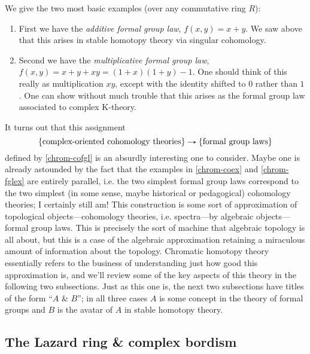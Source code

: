\begin{examples}
  \label{chrom-fglex}
  We give the two most basic examples (over any commutative ring $R$):
  \begin{enumerate}
  \item First we have the \emph{additive formal group law},
    $f(x,y) = x+y$. We saw above that this arises in stable homotopy
    theory via singular cohomology.
  \item Second we have the \emph{multiplicative formal group law},
    $f(x,y) = x+y+xy = (1+x)(1+y)-1$. One should think of this really
    as multiplication $xy$, except with the identity shifted to $0$
    rather than $1$. One can show without much trouble that this
    arises as the formal group law associated to complex K-theory.
  \end{enumerate}
\end{examples}

It turns out that this assignment
\[
\l\{ \text{complex-oriented cohomology theories} \r\} \to
\l\{ \text{formal group laws} \r\}
\]
defined by \cref{chrom-cofgl} is an absurdly interesting one to
consider. Maybe one is already astounded by the fact that the examples
in \cref{chrom-coex} and \cref{chrom-fglex} are entirely parallel,
i.e. the two simplest formal group laws correspond to the two simplest
(in some sense, maybe historical or pedagogical) cohomology theories;
I certainly still am! This construction is some sort of approximation
of topological objects---cohomology theories, i.e. spectra---by
algebraic objects---formal group laws. This is precisely the sort of
machine that algebraic topology is all about, but this is a case of
the algebraic approximation retaining a miraculous amount of
information about the topology. Chromatic homotopy theory essentially
refers to the business of understanding just how good this
approximation is, and we'll review some of the key aspects of this
theory in the following two subsections. Just as this one is, the next
two subsections have titles of the form ``$A$ \& $B$''; in all three
cases $A$ is some concept in the theory of formal groups and $B$ is
the avatar of $A$ in stable homotopy theory.

\subsection{The Lazard ring \& complex bordism}
\label{chrom-lazmu}

